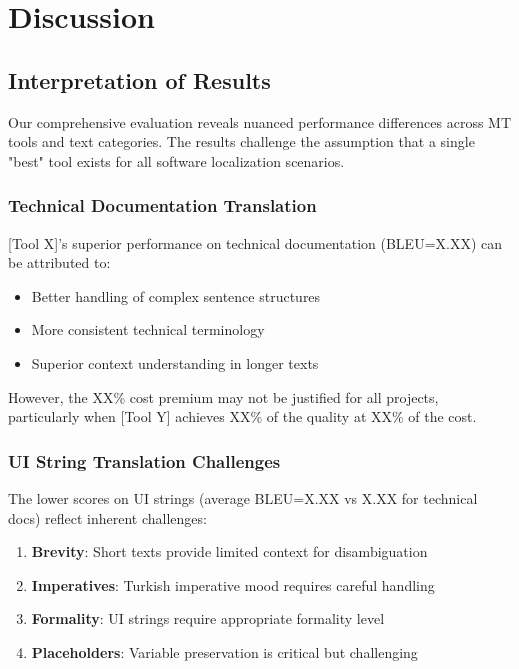 \section{Discussion}

\subsection{Interpretation of Results}

Our comprehensive evaluation reveals nuanced performance differences across MT tools and text categories. The results challenge the assumption that a single "best" tool exists for all software localization scenarios.

\subsubsection{Technical Documentation Translation}

[Tool X]'s superior performance on technical documentation (BLEU=X.XX) can be attributed to:
\begin{itemize}
    \item Better handling of complex sentence structures
    \item More consistent technical terminology
    \item Superior context understanding in longer texts
\end{itemize}

However, the XX\% cost premium may not be justified for all projects, particularly when [Tool Y] achieves XX\% of the quality at XX\% of the cost.

\subsubsection{UI String Translation Challenges}

The lower scores on UI strings (average BLEU=X.XX vs X.XX for technical docs) reflect inherent challenges:

\begin{enumerate}
    \item \textbf{Brevity}: Short texts provide limited context for disambiguation
    \item \textbf{Imperatives}: Turkish imperative mood requires careful handling
    \item \textbf{Formality}: UI strings require appropriate formality level
    \item \textbf{Placeholders}: Variable preservation is critical but challenging
\end{enumerate}

